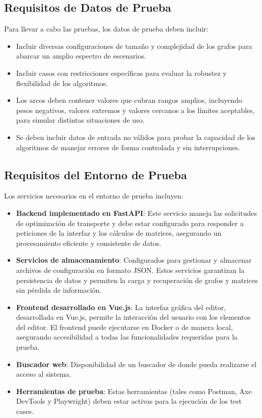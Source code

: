 \documentclass[stu, 12pt, letterpaper, donotrepeattitle, floatsintext, natbib]{apa7}
\begin{document}
\subsection{Requisitos de Datos de Prueba}
Para llevar a cabo las pruebas, los datos de prueba deben incluir:
\begin{itemize}
    \item Incluir diversas configuraciones de tamaño y complejidad de los grafos para abarcar un amplio espectro de escenarios.
    \item Incluir casos con restricciones específicas para evaluar la robustez y flexibilidad de los algoritmos.
    \item Los arcos deben contener valores que cubran rangos amplios, incluyendo pesos negativos, valores extremos y valores cercanos a los límites aceptables, para simular distintas situaciones de uso.
    \item Se deben incluir datos de entrada no válidos para probar la capacidad de los algoritmos de manejar errores de forma controlada y sin interrupciones.
\end{itemize}

\subsection{Requisitos del Entorno de Prueba}
Los servicios necesarios en el entorno de prueba incluyen:

\begin{itemize}
    \item \textbf{Backend implementado en FastAPI}: Este servicio maneja las solicitudes de optimización de transporte y debe estar configurado para responder a peticiones de la interfaz y los cálculos de matrices, asegurando un procesamiento eficiente y consistente de datos.
    \item \textbf{Servicios de almacenamiento}: Configurados para gestionar y almacenar archivos de configuración en formato JSON. Estos servicios garantizan la persistencia de datos y permiten la carga y recuperación de grafos y matrices sin pérdida de información.
    \item \textbf{Frontend desarrollado en Vue.js}: La interfaz gráfica del editor, desarrollada en Vue.js, permite la interacción del usuario con los elementos del editor. El frontend puede ejecutarse en Docker o de manera local, asegurando accesibilidad a todas las funcionalidades requeridas para la prueba.
    \item \textbf{Buscador web}: Disponibilidad de un buscador de donde pueda realizarse el acceso al sistema.
    \item \textbf{Herramientas de prueba}: Estas herramientas (tales como Postman, Axe DevTools y Playwright) deben estar activas para la ejecución de los test cases.

\end{itemize}
\end{document}
